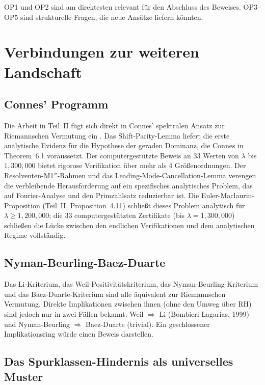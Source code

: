 \documentclass[12pt,a4paper]{article}
\theoremstyle{definition}
\theoremstyle{remark}
\begin{document}
\noindent OP1 und OP2 sind am direktesten relevant für den Abschluss des Beweises. OP3--OP5 sind strukturelle Fragen, die neue Ansätze liefern könnten.


\section{Verbindungen zur weiteren Landschaft}
\label{sec:connections}

\subsection{Connes' Programm}

Die Arbeit in Teil~II fügt sich direkt in Connes' spektralen Ansatz zur Riemannschen Vermutung ein \cite{Connes2025}. Das Shift-Parity-Lemma liefert die erste analytische Evidenz für die Hypothese der geraden Dominanz, die Connes in Theorem~6.1 voraussetzt. Der computergestützte Beweis an $33$ Werten von $\lambda$ bis $1{,}300{,}000$ bietet rigorose Verifikation über mehr als $4$ Größenordnungen. Der Resolventen-M1$''$-Rahmen und das Leading-Mode-Cancellation-Lemma verengen die verbleibende Herausforderung auf ein spezifisches analytisches Problem, das auf Fourier-Analyse und den Primzahlsatz reduzierbar ist. Die Euler-Maclaurin-Proposition (Teil~II, Proposition~4.11) schließt dieses Problem analytisch für $\lambda \geq 1{,}200{,}000$; die $33$ computergestützten Zertifikate (bis $\lambda = 1{,}300{,}000$) schließen die Lücke zwischen den endlichen Verifikationen und dem analytischen Regime vollständig.

\subsection{Nyman-Beurling-Baez-Duarte}

Das Li-Kriterium, das Weil-Positivitätskriterium, das Nyman-Beurling-Kriterium und das Baez-Duarte-Kriterium sind alle äquivalent zur Riemannschen Vermutung. Direkte Implikationen zwischen ihnen (ohne den Umweg über RH) sind jedoch nur in zwei Fällen bekannt: Weil $\Rightarrow$ Li (Bombieri-Lagarias, 1999) und Nyman-Beurling $\Rightarrow$ Baez-Duarte (trivial). Ein geschlossener Implikationsring würde einen Beweis darstellen.

\subsection{Das Spurklassen-Hindernis als universelles Muster}
\end{document}
